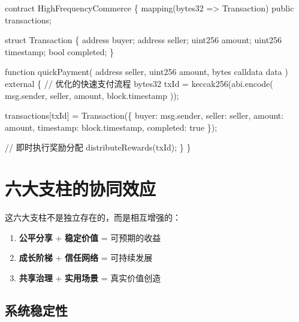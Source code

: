 \documentclass[
  Letterpaper,
]{scrbook}
\newenvironment{Shaded}{\begin{snugshade}}{\end{snugshade}}
\newcommand{\NormalTok}[1]{\textcolor[rgb]{0.00,0.23,0.31}{#1}}
\providecommand{\tightlist}{%
  \setlength{\itemsep}{0pt}\setlength{\parskip}{0pt}}
\begin{document}
\begin{Shaded}
\begin{Highlighting}[]
\NormalTok{contract HighFrequencyCommerce \{}
\NormalTok{    mapping(bytes32 =\textgreater{} Transaction) public transactions;}
    
\NormalTok{    struct Transaction \{}
\NormalTok{        address buyer;}
\NormalTok{        address seller;}
\NormalTok{        uint256 amount;}
\NormalTok{        uint256 timestamp;}
\NormalTok{        bool completed;}
\NormalTok{    \}}
    
\NormalTok{    function quickPayment(}
\NormalTok{        address seller,}
\NormalTok{        uint256 amount,}
\NormalTok{        bytes calldata data}
\NormalTok{    ) external \{}
\NormalTok{        // 优化的快速支付流程}
\NormalTok{        bytes32 txId = keccak256(abi.encode(}
\NormalTok{            msg.sender, seller, amount, block.timestamp}
\NormalTok{        ));}
        
\NormalTok{        transactions[txId] = Transaction(\{}
\NormalTok{            buyer: msg.sender,}
\NormalTok{            seller: seller,}
\NormalTok{            amount: amount,}
\NormalTok{            timestamp: block.timestamp,}
\NormalTok{            completed: true}
\NormalTok{        \});}
        
\NormalTok{        // 即时执行奖励分配}
\NormalTok{        distributeRewards(txId);}
\NormalTok{    \}}
\NormalTok{\}}
\end{Highlighting}
\end{Shaded}

\section{六大支柱的协同效应}\label{ux516dux5927ux652fux67f1ux7684ux534fux540cux6548ux5e94}

这六大支柱不是独立存在的，而是相互增强的：

\begin{enumerate}
\def\labelenumi{\arabic{enumi}.}
\tightlist
\item
  \textbf{公平分享} + \textbf{稳定价值} = 可预期的收益
\item
  \textbf{成长阶梯} + \textbf{信任网络} = 可持续发展
\item
  \textbf{共享治理} + \textbf{实用场景} = 真实价值创造
\end{enumerate}

\subsection{系统稳定性}\label{ux7cfbux7edfux7a33ux5b9aux6027}
\end{document}

